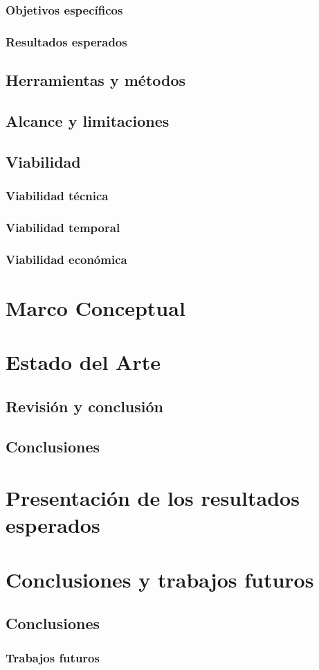 \documentclass[a4paper,openright,12pt]{report}
\begin{document}
\subsection{Objetivos específicos}
\subsection{Resultados esperados}
\section{Herramientas y métodos}
\section{Alcance y limitaciones}
\section{Viabilidad}
\subsection{Viabilidad técnica}
\subsection{Viabilidad temporal}
\subsection{Viabilidad económica}
\chapter{Marco Conceptual}
\chapter{Estado del Arte}
\section{Revisión y conclusión}
\section{Conclusiones}
\chapter{Presentación de los resultados esperados}
\chapter{Conclusiones y trabajos futuros}
\section{Conclusiones}
\subsection{Trabajos futuros}
\end{document}
